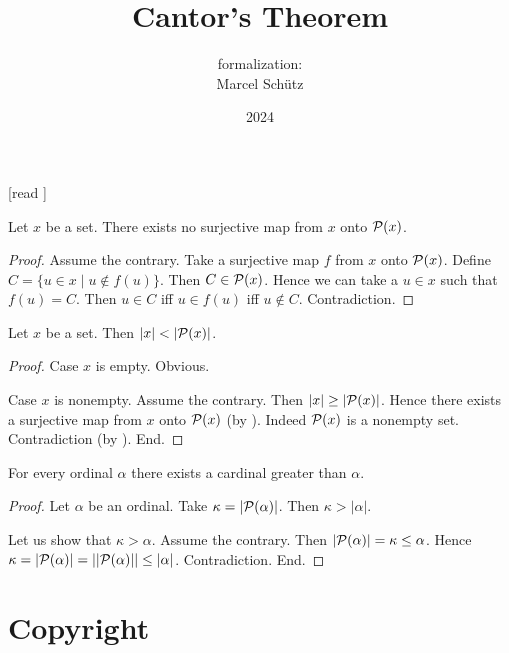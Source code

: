 \documentclass{article}
\title{Cantor's Theorem}
\author{\Naproche formalization: \vspace{0.5em} \\
Marcel Schütz}
\date{2024}
\begin{document}
  \maketitle

  \begin{imports}
    \begin{forthel}
      [read ]
    \end{forthel}
  \end{imports}

  \begin{forthel}
    \begin{theorem*}[title=Cantor's Theorem,id=cantor]
      Let $x$ be a set.
      There exists no surjective map from $x$ onto $\mathcal{P}(x)$.
    \end{theorem*}
    \begin{proof}
      Assume the contrary.
      Take a surjective map $f$ from $x$ onto $\mathcal{P}(x)$.
      Define $C = \{ u \in x \mid u \notin f(u) \}$.
      Then $C \in \mathcal{P}(x)$.
      Hence we can take a $u \in x$ such that $f(u) = C$.
      Then $u \in C$ iff $u \in f(u)$ iff $u \notin C$.
      Contradiction.
    \end{proof}
  \end{forthel}

  \begin{forthel}
    \begin{corollary*}
      Let $x$ be a set.
      Then $|x| < |\mathcal{P}(x)|$.
    \end{corollary*}
    \begin{proof}
      Case $x$ is empty. Obvious.

      Case $x$ is nonempty.
        Assume the contrary.
        Then $|x| \geq |\mathcal{P}(x)|$.
        Hence there exists a surjective map from $x$ onto $\mathcal{P}(x)$ (by ).
        Indeed $\mathcal{P}(x)$ is a nonempty set.
        Contradiction (by ).
      End.
    \end{proof}
  \end{forthel}

  \begin{forthel}
    \begin{corollary*}
      For every ordinal $\alpha$ there exists a cardinal greater than $\alpha$.
    \end{corollary*}
    \begin{proof}
      Let $\alpha$ be an ordinal.
      Take $\kappa = |\mathcal{P}(\alpha)|$.
      Then $\kappa > |\alpha|$.

      Let us show that $\kappa > \alpha$.
        Assume the contrary.
        Then $|\mathcal{P}(\alpha)|
          = \kappa
          \leq \alpha$.
        Hence $\kappa
          = |\mathcal{P}(\alpha)|
          = ||\mathcal{P}(\alpha)||
          \leq |\alpha|$.
        Contradiction.
      End.
    \end{proof}
  \end{forthel}

  \section*{Copyright}
  \doclicenseThis
\end{document}
